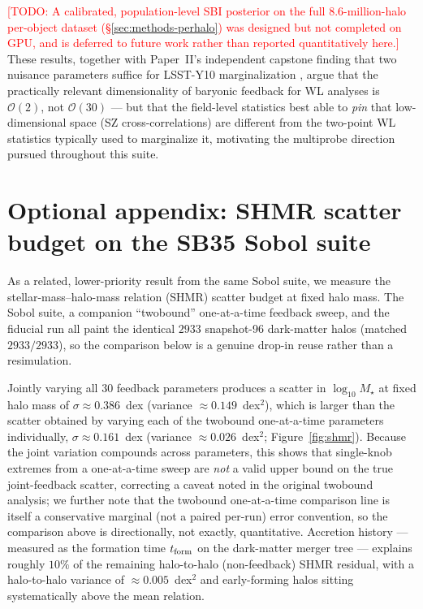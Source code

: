 \documentclass[11pt]{article}
\newcommand{\todo}[1]{\textcolor{red}{[TODO: #1]}}
\begin{document}
\todo{A calibrated, population-level SBI posterior on the full
$8.6$-million-halo per-object dataset (\S\ref{sec:methods-perhalo}) was
designed but not completed on GPU, and is deferred to future work rather
than reported quantitatively here.}
These results, together with Paper~II's independent capstone finding that
two nuisance parameters suffice for LSST-Y10 marginalization
\citep[Paper~II, in prep]{bindII}, argue that the practically relevant
dimensionality of baryonic feedback for WL analyses is $\mathcal{O}(2)$,
not $\mathcal{O}(30)$ — but that the field-level statistics best able to
\emph{pin} that low-dimensional space (SZ cross-correlations) are
different from the two-point WL statistics typically used to marginalize
it, motivating the multiprobe direction pursued throughout this suite.

\appendix
\section{Optional appendix: SHMR scatter budget on the SB35 Sobol suite}\label{sec:app-shmr}

As a related, lower-priority result from the same Sobol suite, we measure
the stellar-mass--halo-mass relation (SHMR) scatter budget at fixed halo
mass. The Sobol suite, a companion ``twobound'' one-at-a-time feedback
sweep, and the fiducial run all paint the identical $2933$ snapshot-96
dark-matter halos (matched $2933/2933$), so the comparison below is a
genuine drop-in reuse rather than a resimulation. %

Jointly varying all 30 feedback parameters produces a scatter in
$\log_{10} M_\star$ at fixed halo mass of $\sigma\approx0.386$~dex
(variance $\approx0.149$~dex$^2$), which is larger than the scatter
obtained by varying each of the twobound one-at-a-time parameters
individually, $\sigma\approx0.161$~dex (variance $\approx0.026$~dex$^2$;
Figure~\ref{fig:shmr}). %
Because the joint variation compounds across parameters, this shows that
single-knob extremes from a one-at-a-time sweep are \emph{not} a valid
upper bound on the true joint-feedback scatter, correcting a caveat noted
in the original twobound analysis; we further note that the twobound
one-at-a-time comparison line is itself a conservative marginal (not a
paired per-run) error convention, so the comparison above is
directionally, not exactly, quantitative. %
Accretion history — measured as the formation time $t_{\rm form}$ on the
dark-matter merger tree — explains roughly $10\%$ of the remaining
halo-to-halo (non-feedback) SHMR residual, with a halo-to-halo variance of
$\approx0.005$~dex$^2$ and early-forming halos sitting systematically
above the mean relation. %
\end{document}
